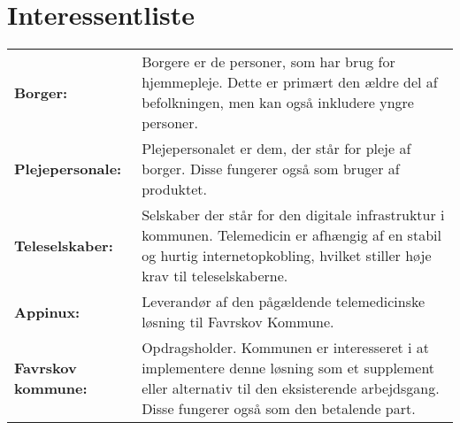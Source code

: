 \documentclass[10pt,a4paper]{article}
\begin{document}
\section{Interessentliste}
\begin{tabular}{p{3cm}p{11cm}}
\textbf{Borger:} & Borgere er de personer, som har brug for hjemmepleje. Dette er primært den ældre del af befolkningen, men kan også inkludere yngre personer. \\ 

\textbf{Plejepersonale:} & Plejepersonalet er dem, der står for pleje af borger. Disse fungerer også som bruger af produktet. \\

\textbf{Teleselskaber:} & Selskaber der står for den digitale infrastruktur i kommunen. Telemedicin er afhængig af en stabil og hurtig internetopkobling, hvilket stiller høje krav til teleselskaberne.\\

\textbf{Appinux:} & Leverandør af den pågældende telemedicinske løsning til Favrskov Kommune.\\

\textbf{Favrskov kommune:} & Opdragsholder. Kommunen er interesseret i at implementere denne løsning som et supplement eller alternativ til den eksisterende arbejdsgang. Disse fungerer også som den betalende part. 


\end{tabular}
\end{document}
